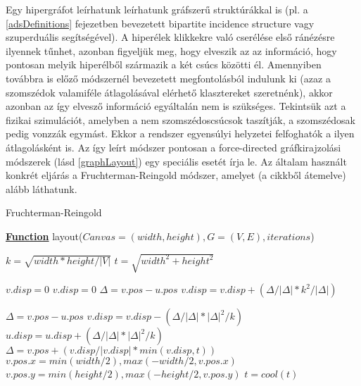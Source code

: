 Egy hipergráfot leírhatunk leírhatunk gráfszerű struktúrákkal is (pl. a \ref{adsDefinitions} fejezetben bevezetett bipartite incidence structure vagy szuperduális segítségével). A hiperélek klikkekre való cserélése első ránézésre ilyennek tűnhet, azonban figyeljük meg, hogy elveszik az az információ, hogy pontosan melyik hiperélből származik a két csúcs közötti él. Amennyiben továbbra is előző módszernél bevezetett megfontolásból indulunk ki (azaz a szomszédok valamiféle átlagolásával elérhető klasztereket szeretnénk), akkor azonban az így elvesző információ egyáltalán nem is szükséges. Tekintsük azt a fizikai szimulációt, amelyben a nem szomszédoscsúcsok taszítják, a szomszédosak pedig vonzzák egymást. Ekkor a rendszer egyensúlyi helyzetei felfoghatók a ilyen átlagolásként is. Az így leírt módszer pontosan a force-directed gráfkirajzolási módszerek (lásd \ref{graphLayout}) egy speciális esetét írja le. Az általam használt konkrét eljárás a Fruchterman-Reingold módszer\cite{graph_layout_fruchterman}, amelyet (a cikkből átemelve) alább láthatunk.


\begin{algorithm}[H]
\caption{Fruchterman-Reingold}
\label{alg:fruchterman} 
\textbf{\underline{Function}} layout($Canvas=(width, height), G=(V,E), iterations$)
\begin{algorithmic}[1]
\STATE $k = \sqrt{width*height/|V|}$
\STATE $t = \sqrt{width^2+height^2}$ 



	 
		\STATE $v.disp = 0$
				\STATE $v.disp = 0$
				\STATE $\Delta = v.pos - u.pos$
				\STATE $v.disp = v.disp + (\Delta/|\Delta|*k^2/|\Delta|)$
			\ENDIF
		\ENDFOR
	\ENDFOR
	
	
	 
		\STATE $\Delta = v.pos - u.pos$
		\STATE $v.disp = v.disp - (\Delta/|\Delta|*|\Delta|^2/k)$
		\STATE $u.disp = u.disp + (\Delta/|\Delta|*|\Delta|^2/k)$
	\ENDFOR
		\STATE $\Delta = v.pos + (v.disp/|v.disp|*min(v.disp,t))$ 
		\STATE $v.pos.x = min(width/2), max(-width/2, v.pos.x)$ 
		\STATE $v.pos.y = min(height/2), max(-height/2, v.pos.y)$
	\ENDFOR
	\STATE $t = cool(t)$ 
\ENDFOR
\end{algorithmic}
\end{algorithm}

